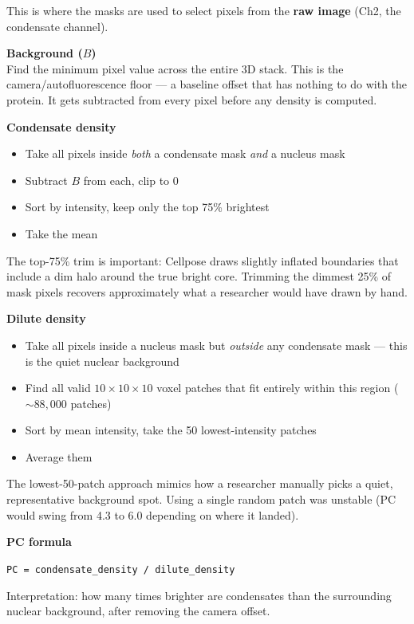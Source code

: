 \documentclass[11pt]{article}
\newenvironment{codebox}{%
  \vspace{6pt}\par
  \noindent\hspace{1cm}%
}{%
  \par\vspace{6pt}%
}
\begin{document}
This is where the masks are used to select pixels from the \textbf{raw image} (Ch2, the condensate channel).

\textbf{Background ($B$)} \\
Find the minimum pixel value across the entire 3D stack. This is the camera/autofluorescence floor --- a baseline offset that has nothing to do with the protein. It gets subtracted from every pixel before any density is computed.

\textbf{Condensate density}
\begin{itemize}
  \item Take all pixels inside \textit{both} a condensate mask \textit{and} a nucleus mask
  \item Subtract $B$ from each, clip to 0
  \item Sort by intensity, keep only the top 75\% brightest
  \item Take the mean
\end{itemize}
The top-75\% trim is important: Cellpose draws slightly inflated boundaries that include a dim halo around the true bright core. Trimming the dimmest 25\% of mask pixels recovers approximately what a researcher would have drawn by hand.

\textbf{Dilute density}
\begin{itemize}
  \item Take all pixels inside a nucleus mask but \textit{outside} any condensate mask --- this is the quiet nuclear background
  \item Find all valid $10{\times}10{\times}10$ voxel patches that fit entirely within this region (${\sim}88{,}000$ patches)
  \item Sort by mean intensity, take the 50 lowest-intensity patches
  \item Average them
\end{itemize}
The lowest-50-patch approach mimics how a researcher manually picks a quiet, representative background spot. Using a single random patch was unstable (PC would swing from 4.3 to 6.0 depending on where it landed).

\textbf{PC formula}
\begin{codebox}
\texttt{PC = condensate\_density / dilute\_density}
\end{codebox}
Interpretation: how many times brighter are condensates than the surrounding nuclear background, after removing the camera offset.

\end{document}
